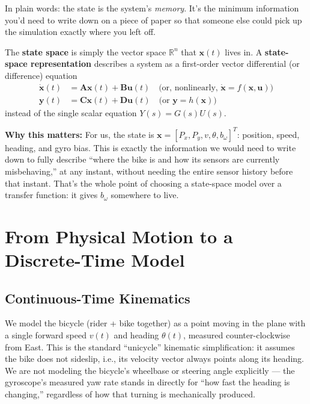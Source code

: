 \documentclass[11pt,a4paper]{article}
\newcommand{\note}[1]{\par\noindent\textbf{Why this matters:} #1\par}
\begin{document}
In plain words: the state is the system's \emph{memory}. It's the minimum information you'd need to write down on a piece of paper so that someone else could pick up the simulation exactly where you left off.

The \textbf{state space} is simply the vector space $\mathbb{R}^n$ that $\mathbf{x}(t)$ lives in. A \textbf{state-space representation} describes a system as a first-order vector differential (or difference) equation
\begin{align}
    \dot{\mathbf{x}}(t) &= \mathbf{A}\mathbf{x}(t) + \mathbf{B}\mathbf{u}(t) \quad \text{(or, nonlinearly, } \dot{\mathbf{x}} = f(\mathbf{x},\mathbf{u}) \text{)}\\
    \mathbf{y}(t) &= \mathbf{C}\mathbf{x}(t) + \mathbf{D}\mathbf{u}(t) \quad \text{(or } \mathbf{y} = h(\mathbf{x}) \text{)}
\end{align}
instead of the single scalar equation $Y(s) = G(s)U(s)$.

\note{For us, the state is $\mathbf{x} = [P_x, P_y, v, \theta, b_\omega]^T$: position, speed, heading, and gyro bias. This is exactly the information we would need to write down to fully describe ``where the bike is and how its sensors are currently misbehaving,'' at any instant, without needing the entire sensor history before that instant. That's the whole point of choosing a state-space model over a transfer function: it gives $b_\omega$ somewhere to live.}

\section{From Physical Motion to a Discrete-Time Model}

\subsection{Continuous-Time Kinematics}

We model the bicycle (rider + bike together) as a point moving in the plane with a single forward speed $v(t)$ and heading $\theta(t)$, measured counter-clockwise from East. This is the standard ``unicycle'' kinematic simplification: it assumes the bike does not sideslip, i.e., its velocity vector always points along its heading. We are not modeling the bicycle's wheelbase or steering angle explicitly --- the gyroscope's measured yaw rate stands in directly for ``how fast the heading is changing,'' regardless of how that turning is mechanically produced.
\end{document}
